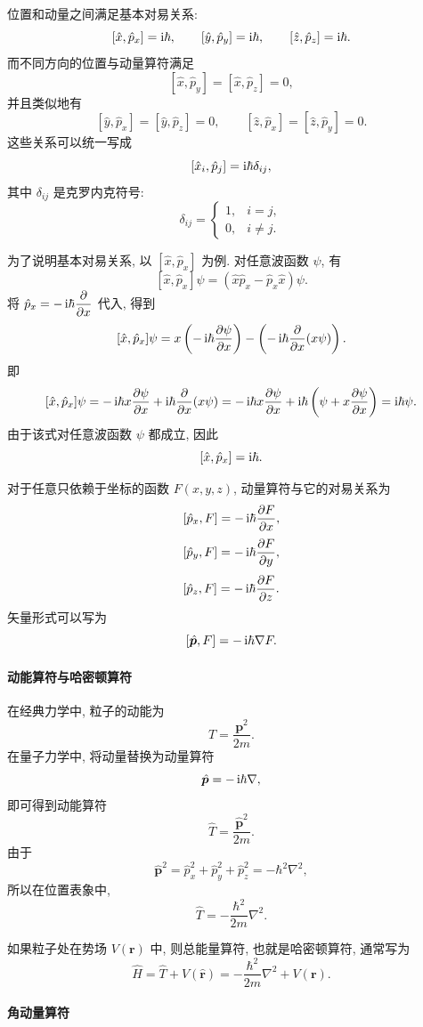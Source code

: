 位置和动量之间满足基本对易关系:
\[
[\hat x, \hat p_x]=\mathop{}\!\mathrm{i}\hbar, \qquad
[\hat y, \hat p_y]=\mathop{}\!\mathrm{i}\hbar, \qquad
[\hat z, \hat p_z]=\mathop{}\!\mathrm{i}\hbar.
\]
而不同方向的位置与动量算符满足
\[
[\hat x, \hat p_y]=[\hat x, \hat p_z]=0,
\]
并且类似地有
\[
[\hat y, \hat p_x]=[\hat y, \hat p_z]=0,
\qquad
[\hat z, \hat p_x]=[\hat z, \hat p_y]=0.
\]
这些关系可以统一写成
\[
[\hat x_i, \hat p_j]=\mathop{}\!\mathrm{i}\hbar\delta_{ij},
\]
其中 $\delta_{ij}$ 是克罗内克符号:
\[
\delta_{ij}=
\begin{cases}
1, & i=j, \\
0, & i\neq j.
\end{cases}
\]

为了说明基本对易关系, 以 $[\hat x, \hat p_x]$ 为例. 对任意波函数 $\psi$, 有
\[
[\hat x, \hat p_x]\psi
=
(\hat x\hat p_x-\hat p_x\hat x)\psi.
\]
将 $\hat p_x=-\mathop{}\!\mathrm{i}\hbar\dfrac{\partial}{\partial x}$ 代入, 得到
\[
[\hat x, \hat p_x]\psi
=
x\left(-\mathop{}\!\mathrm{i}\hbar\frac{\partial \psi}{\partial x}\right)
-
\left(-\mathop{}\!\mathrm{i}\hbar\frac{\partial}{\partial x}(x\psi)\right).
\]
即
\[
[\hat x, \hat p_x]\psi
=
-\mathop{}\!\mathrm{i}\hbar x\frac{\partial\psi}{\partial x}
+
\mathop{}\!\mathrm{i}\hbar\frac{\partial}{\partial x}(x\psi)
=
-\mathop{}\!\mathrm{i}\hbar x\frac{\partial\psi}{\partial x}
+
\mathop{}\!\mathrm{i}\hbar\left(\psi+x\frac{\partial\psi}{\partial x}\right)
=
\mathop{}\!\mathrm{i}\hbar\psi.
\]
由于该式对任意波函数 $\psi$ 都成立, 因此
\[
[\hat x, \hat p_x]=\mathop{}\!\mathrm{i}\hbar.
\]


对于任意只依赖于坐标的函数 $F(x, y, z)$, 动量算符与它的对易关系为
\[
[\hat p_x, F]=-\mathop{}\!\mathrm{i}\hbar\frac{\partial F}{\partial x},
\]
\[
[\hat p_y, F]=-\mathop{}\!\mathrm{i}\hbar\frac{\partial F}{\partial y},
\]
\[
[\hat p_z, F]=-\mathop{}\!\mathrm{i}\hbar\frac{\partial F}{\partial z}.
\]
矢量形式可以写为
\[
[\hat{\bm p}, F]=-\mathop{}\!\mathrm{i}\hbar\nabla F.
\]

\paragraph{动能算符与哈密顿算符}

在经典力学中, 粒子的动能为
\[
T=\frac{\bm p^2}{2m}.
\]
在量子力学中, 将动量替换为动量算符
\[
\hat{\bm p}=-\mathop{}\!\mathrm{i}\hbar\nabla,
\]
即可得到动能算符
\[
\hat T
=
\frac{\hat{\bm p}^2}{2m}.
\]
由于
\[
\hat{\bm p}^2
=
\hat p_x^2+\hat p_y^2+\hat p_z^2
=
-\hbar^2\nabla^2,
\]
所以在位置表象中,
\[
\hat T
=
-\frac{\hbar^2}{2m}\nabla^2.
\]

如果粒子处在势场 $V(\bm r)$ 中, 则总能量算符, 也就是哈密顿算符, 通常写为
\[
\hat H
=
\hat T+V(\hat{\bm r})
=
-\frac{\hbar^2}{2m}\nabla^2+V(\bm r).
\]

\paragraph{角动量算符}

